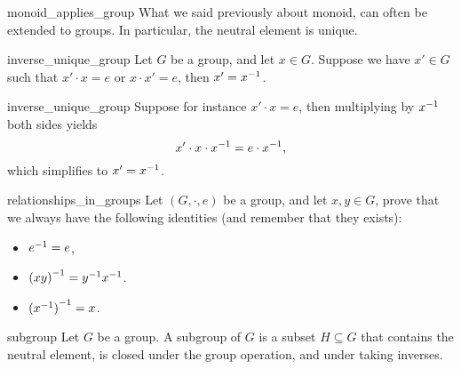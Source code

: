 \begin{crem}{}{monoid_applies_group}
    What we said previously about monoid, can often be extended to groups. In particular, the neutral element is unique.
\end{crem}

\begin{clem}{}{inverse_unique_group}
    Let \( G \) be a group, and let \( x \in G \). Suppose we have \( x' \in G \) such that \( x' \cdot x = e \) or \( x \cdot x' = e \), then \( x' = {x}^{-1} \).
\end{clem}
\begin{lemproof}{inverse_unique_group}
    Suppose for instance \( x' \cdot x = e \), then multiplying by \( {x}^{-1} \) both sides yields
    \begin{equation*}
        x' \cdot x \cdot {x}^{-1} = e \cdot {x}^{-1},
    \end{equation*}
    which simplifies to \( x' = {x}^{-1} \). 
\end{lemproof}

\begin{cex}{}{relationships_in_groups}
    Let \( (G, \cdot, e) \) be a group, and let \( x, y \in G \), prove that we always have the following identities (and remember that they exists):
    \begin{itemize}
        \item \( {e}^{-1} = e \),
        \item \( {(xy)}^{-1} = {y}^{-1} {x}^{-1} \).
        \item \( {({x}^{-1})}^{-1} = x \).
    \end{itemize} 
\end{cex}

\begin{cdef}{}{subgroup}
    Let \( G \) be a group. A subgroup of \( G \) is a subset \( H \subseteq G \) that contains the neutral element, is closed under the group operation, and under taking inverses.
\end{cdef}

